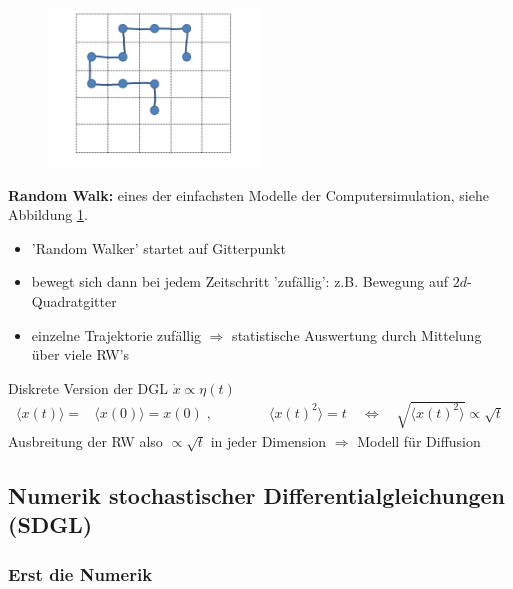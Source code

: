 \documentclass[12pt]{article}
\begin{document}
\begin{figure}[ht]
\centering
\includegraphics[width=0.5\textwidth]{Folie78.png}
	\caption{}
	\label{fig:RandomWalk}
\end{figure}
\textbf{Random Walk:} eines der einfachsten Modelle der Computersimulation, siehe Abbildung \ref{fig:RandomWalk}.
\begin{itemize}
\item 'Random Walker' startet auf Gitterpunkt
\item bewegt sich dann bei jedem Zeitschritt 'zufällig': z.B. Bewegung auf $2d$-Quadratgitter
\item einzelne Trajektorie zufällig $\Rightarrow$ statistische Auswertung durch Mittelung über viele RW's
\end{itemize}
Diskrete Version der DGL $\dot{x} \propto \eta (t)$
\begin{align*}
\langle x(t) \rangle =& \langle x(0) \rangle = x(0)\;  , \qquad \qquad
\langle x(t)^2 \rangle =  t \quad \Leftrightarrow \quad \sqrt{\langle x(t)^2 \rangle} \propto \sqrt{t}
\end{align*}
Ausbreitung der RW also $\propto \sqrt{t}$ in jeder Dimension $\Rightarrow$ Modell für Diffusion

\subsection*{Numerik stochastischer Differentialgleichungen (SDGL)}
\subsubsection{Erst die Numerik}
\end{document}
